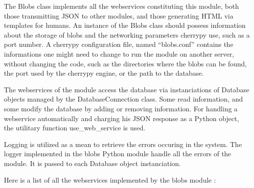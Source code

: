 The Blobs class implements all the webservices constituting this module, both those transmitting JSON to other modules, and those generating HTML via templates for humans. An instance of the Blobs class should possess information about the storage of blobs and the networking parameters cherrypy use, such as a port number. A cherrypy configuration file, named ``blobs.conf'' contains the informations one might need to change to run the module on another server, without changing the code, such as the directories where the blobs can be found, the port used by the cherrypy engine, or the path to the database.

The webservices of the module access the database via instanciations of Database objects managed by the DatabaseConnection class. Some read information, and some modify the database by adding or removing information. For handling a webservice automatically and charging his JSON response as a Python object, the utilitary function use\_web\_service is used.

Logging is utilized as a mean to retrieve the errors occuring in the system. The logger implemented in the blobs Python module handle all the errors of the module. It is passed to each Database object instanciation.

Here is a list of all the webservices implemented by the blobs module :


